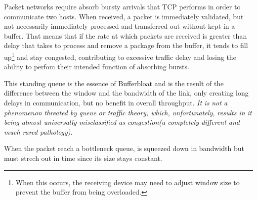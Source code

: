 Packet networks require absorb bursty arrivals that TCP performs in order to
communicate two hosts. When received, a packet is immediately validated, but
not necessarily immediately processed and transferred out without kept in a
buffer. That means that if the rate at which packets are received is greater
than delay that takes to process and remove a package from the buffer, it
tends to fill up\footnote{When this occurs, the receiving device may need to
adjust window size to prevent the buffer from being overloaded.} and stay
congested, contributing to excessive traffic delay and losing the ability to
perfom their intended function of absorbing bursts.

This standing queue is the essence of Bufferbloat and is the result of the
difference between the window and the bandwidth of the link, only creating
long delays in communication, but no benefit in overall throughput. \textit{It
is not a phenomenon threated by queue or traffic theory, which, unfortunately,
results in it being almost universally misclassified as congestion(a
completely different and much rared pathology)}\cite{CACMStaff}.

When the packet reach a bottleneck queue, is squeezed down in bandwidth but
must strech out in time since its size stays constant.
